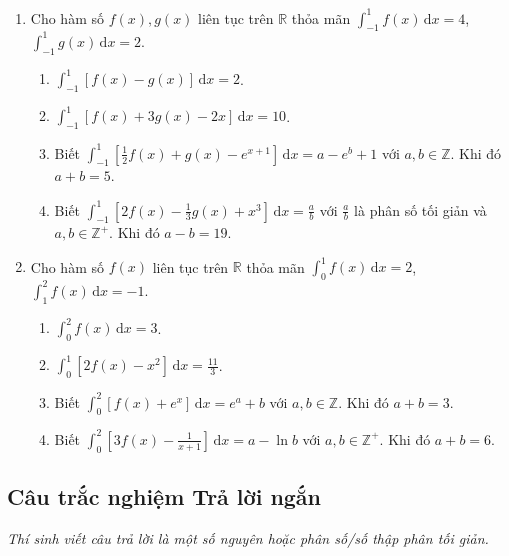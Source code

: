 \documentclass[12pt]{article}
\begin{document}
\begin{enumerate}[label=\textbf{Câu \arabic*.}]
		\item Cho hàm số $f(x), g(x)$ liên tục trên $\mathbb{R}$ thỏa mãn $\displaystyle \int_{-1}^1 f(x)\,\mathrm{d}x = 4$, $\displaystyle \int_{-1}^1 g(x)\,\mathrm{d}x = 2$.
		\begin{enumerate}[label=\alph*)]
			\item $\displaystyle \int_{-1}^1 [f(x) - g(x)]\,\mathrm{d}x = 2$.
			\item $\displaystyle \int_{-1}^1 [f(x) + 3g(x) - 2x]\,\mathrm{d}x = 10$.
			\item Biết $\displaystyle \int_{-1}^1 \left[\frac{1}{2}f(x) + g(x) - e^{x+1}\right]\,\mathrm{d}x = a - e^b + 1$ với $a, b \in \mathbb{Z}$. Khi đó $a+b = 5$.
			\item Biết $\displaystyle \int_{-1}^1 \left[2f(x) - \frac{1}{3}g(x) + x^3\right]\,\mathrm{d}x = \frac{a}{b}$ với $\frac{a}{b}$ là phân số tối giản và $a, b \in \mathbb{Z}^+$. Khi đó $a-b = 19$.
		\end{enumerate}
		
		\item Cho hàm số $f(x)$ liên tục trên $\mathbb{R}$ thỏa mãn $\displaystyle \int_0^1 f(x)\,\mathrm{d}x = 2$, $\displaystyle \int_1^2 f(x)\,\mathrm{d}x = -1$.
		\begin{enumerate}[label=\alph*)]
			\item $\displaystyle \int_0^2 f(x)\,\mathrm{d}x = 3$.
			\item $\displaystyle \int_0^1 [2f(x) - x^2]\,\mathrm{d}x = \frac{11}{3}$.
			\item Biết $\displaystyle \int_0^2 [f(x) + e^x]\,\mathrm{d}x = e^a + b$ với $a, b \in \mathbb{Z}$. Khi đó $a+b = 3$.
			\item Biết $\displaystyle \int_0^2 \left[3f(x) - \frac{1}{x+1}\right]\,\mathrm{d}x = a - \ln b$ với $a, b \in \mathbb{Z}^+$. Khi đó $a+b = 6$.
		\end{enumerate}
\end{enumerate}
	
	\subsection{Câu trắc nghiệm Trả lời ngắn}
	\textit{Thí sinh viết câu trả lời là một số nguyên hoặc phân số/số thập phân tối giản.}
	
\end{document}
